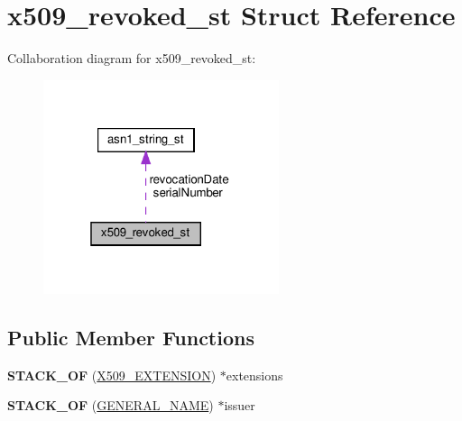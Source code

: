 \hypertarget{structx509__revoked__st}{}\section{x509\+\_\+revoked\+\_\+st Struct Reference}
\label{structx509__revoked__st}


Collaboration diagram for x509\+\_\+revoked\+\_\+st\+:
\nopagebreak
\begin{figure}[H]
\begin{center}
\leavevmode
\includegraphics[width=196pt]{structx509__revoked__st__coll__graph}
\end{center}
\end{figure}
\subsection*{Public Member Functions}
\begin{DoxyCompactItemize}
\item 
\mbox{\label{structx509__revoked__st_ae8a5fc596ad19c4fed74166845e617d9}} 
{\bfseries S\+T\+A\+C\+K\+\_\+\+OF} (\hyperlink{structX509__extension__st}{X509\+\_\+\+E\+X\+T\+E\+N\+S\+I\+ON}) $\ast$extensions
\item 
\mbox{\label{structx509__revoked__st_a17a57286f2072be9985608bcfa1be5b1}} 
{\bfseries S\+T\+A\+C\+K\+\_\+\+OF} (\hyperlink{structGENERAL__NAME__st}{G\+E\+N\+E\+R\+A\+L\+\_\+\+N\+A\+ME}) $\ast$issuer
\end{DoxyCompactItemize}
